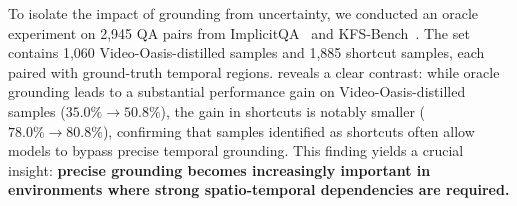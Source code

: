 \documentclass[runningheads]{llncs}
\begin{document}
{        To isolate the impact of grounding from uncertainty, we conducted an oracle experiment on 2,945 QA pairs from ImplicitQA~\cite{implicitqa} and KFS-Bench~\cite{kfs}.
        The set contains 1,060 Video-Oasis-distilled samples and 1,885 shortcut samples, each paired with ground-truth temporal regions.
         reveals a clear contrast: while oracle grounding leads to a substantial performance gain on Video-Oasis-distilled samples ($35.0\% \rightarrow 50.8\%$), the gain in shortcuts is notably smaller ($78.0\% \rightarrow 80.8\%$), confirming that samples identified as shortcuts often allow models to bypass precise temporal grounding. 
        This finding yields a crucial insight: \textbf{precise grounding becomes increasingly important in environments where strong spatio-temporal dependencies are required.} 
    
        \begin{table}[h]
            \vspace{-4mm}
            \centering
            \caption{Upper bound performance (\%) with oracle temporal grounding.}
            \label{tab:main9}
            \setlength{\tabcolsep}{4pt}
        \end{table}

}
\end{document}
